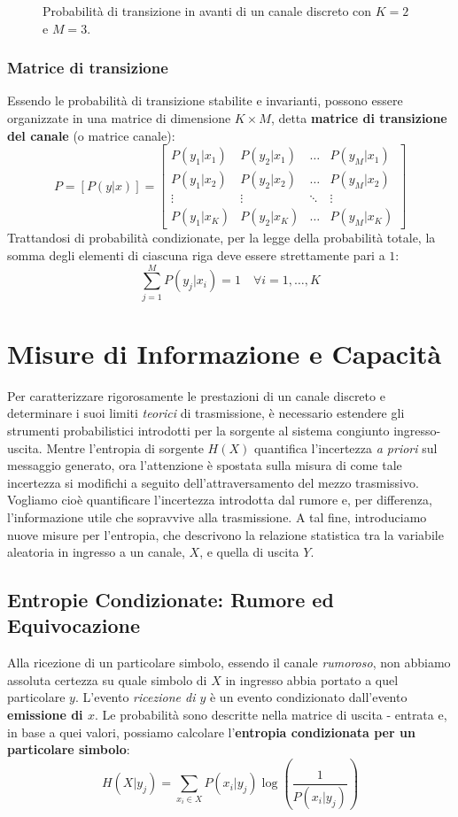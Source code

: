 \begin{figure}[ht!] 
    \centering
    
    \caption{Probabilità di transizione in avanti di un canale discreto con $K=2$ e $M=3$.}
    \label{fig:Prob transizione in avanti}
\end{figure}

\subsubsection{Matrice di transizione}
Essendo le probabilità di transizione stabilite e invarianti, possono essere organizzate in una matrice di dimensione $K \times M$, detta \textbf{matrice di transizione del canale} (o matrice canale):
\[
P = [P(y|x)] = \begin{bmatrix}
P(y_1|x_1) & P(y_2|x_1) & \dots & P(y_M|x_1) \\
P(y_1|x_2) & P(y_2|x_2) & \dots & P(y_M|x_2) \\
\vdots & \vdots & \ddots & \vdots \\
P(y_1|x_K) & P(y_2|x_K) & \dots & P(y_M|x_K)
\end{bmatrix}
\]
Trattandosi di probabilità condizionate, per la legge della probabilità totale, la somma degli elementi di ciascuna riga deve essere strettamente pari a $1$:
\[ \sum_{j=1}^M P(y_j|x_i) = 1 \quad \forall i = 1, \dots, K \]




\section{Misure di Informazione e Capacità}
Per caratterizzare rigorosamente le prestazioni di un canale discreto e determinare i suoi limiti \textit{teorici} di trasmissione, è necessario estendere gli strumenti probabilistici introdotti per la sorgente al sistema congiunto ingresso-uscita.
Mentre l'entropia di sorgente $H(X)$ quantifica l'incertezza \textit{a priori} sul messaggio generato, ora l'attenzione è spostata sulla misura di come tale incertezza si modifichi a seguito dell'attraversamento del mezzo trasmissivo. Vogliamo cioè quantificare l'incertezza introdotta dal rumore e, per differenza, l'informazione utile che sopravvive alla trasmissione.
A tal fine, introduciamo nuove misure per l'entropia, che descrivono la relazione statistica tra la variabile aleatoria in ingresso a un canale, $X$, e quella di uscita $Y$.

\subsection{Entropie Condizionate: Rumore ed Equivocazione}
Alla ricezione di un particolare simbolo, essendo il canale \textit{rumoroso}, non abbiamo assoluta certezza su quale simbolo di $X$ in ingresso abbia portato a quel particolare $y$. L'evento \textit{ricezione di $y$} è un evento condizionato dall'evento \textbf{emissione di $x$}. Le probabilità sono descritte nella matrice di uscita - entrata e, in base a quei valori, possiamo calcolare l'\textbf{entropia condizionata per un particolare simbolo}:
\[H(X|y_j) = \sum_{x_i \in X}P(x_i|y_j)\log\left(\frac{1}{P(x_i|y_j)}\right)\]

